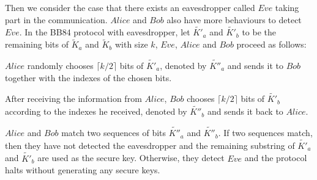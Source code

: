\documentclass[a4paper,UKenglish,cleveref, autoref]{lipics-v2019}
\begin{document}
Then we consider the case that there exists an eavesdropper called $Eve$ taking part in the communication. $Alice$ and $Bob$ also have more behaviours to detect $Eve$. In the BB84 protocol with eavesdropper, let $\tilde{K'}_a$ and $\tilde{K'}_b$ to be the remaining bits of $\tilde{K}_a$ and $\tilde{K}_b$ with size $k$, $Eve$, $Alice$ and $Bob$ proceed as follows:
\begin{bracketenumerate}
    \item $Alice$ randomly chooses $\lceil k/2\rceil$ bits of $\tilde{K'}_a$, denoted by $\tilde{K''}_a$ and sends it to $Bob$ together with the indexes of the chosen bits.
    \item After receiving the information from $Alice$, $Bob$ chooses $\lceil k/2\rceil$ bits of $\tilde{K'}_b$ according to the indexes he received, denoted by $\tilde{K''}_b$ and sends it back to $Alice$.
    \item $Alice$ and $Bob$ match two sequences of bits $\tilde{K''}_{a}$ and $\tilde{K''}_{b}$. If two sequences match, then they have not detected the eavesdropper and the remaining substring of $\tilde{K'}_{a}$ and $\tilde{K'}_{b}$ are used as the secure key. Otherwise, they detect $Eve$ and the protocol halts without generating any secure keys.
\end{bracketenumerate}
\end{document}

